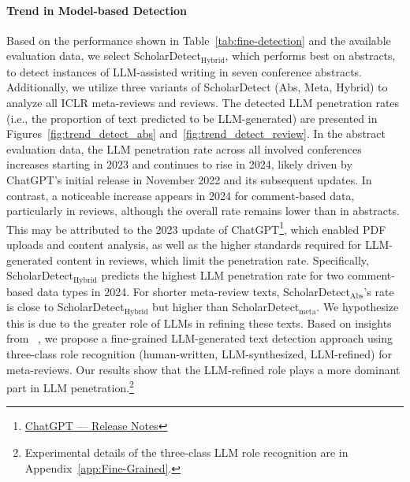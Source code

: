\paragraph{Trend in Model-based Detection}
Based on the performance shown in Table~\ref{tab:fine-detection} and the available evaluation data, we select ScholarDetect$_\text{Hybrid}$, which performs best on abstracts, to detect instances of LLM-assisted writing in seven conference abstracts.
Additionally, we utilize three variants of ScholarDetect (Abs, Meta, Hybrid) to analyze all ICLR meta-reviews and reviews. The detected LLM penetration rates (i.e., the proportion of text predicted to be LLM-generated) are presented in Figures~\ref{fig:trend_detect_abs} and~\ref{fig:trend_detect_review}.
In the abstract evaluation data, the LLM penetration rate across all involved conferences increases starting in 2023 and continues to rise in 2024, likely driven by ChatGPT’s initial release in November 2022 and its subsequent updates.
In contrast, a noticeable increase appears in 2024 for comment-based data, particularly in reviews, although the overall rate remains lower than in abstracts.
This may be attributed to the 2023 update of ChatGPT\footnote{\href{https://help.openai.com/en/articles/6825453-chatgpt-release-notes}{ChatGPT — Release Notes}}, which enabled PDF uploads and content analysis, as well as the higher standards required for LLM-generated content in reviews, which limit the penetration rate.
Specifically, ScholarDetect$_\text{Hybrid}$ predicts the highest LLM penetration rate for two comment-based data types in 2024.  For shorter meta-review texts, ScholarDetect$_\text{Abs}$'s rate is close to ScholarDetect$_\text{Hybrid}$ but higher than ScholarDetect$_\text{meta}$. We hypothesize this is due to the greater role of LLMs in refining these texts. Based on insights from ~\citet{cheng2024beyond}, we propose a fine-grained LLM-generated text detection approach using three-class role recognition (human-written, LLM-synthesized, LLM-refined) for meta-reviews. Our results show that the LLM-refined role plays a more dominant part in LLM penetration.\footnote{Experimental details of the three-class LLM role recognition are in Appendix~\ref{app:Fine-Grained}.}



